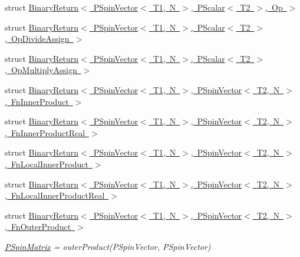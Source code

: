 \begin{DoxyCompactItemize}
\item 
struct \mbox{\hyperlink{structENSEM_1_1BinaryReturn_3_01PSpinVector_3_01T1_00_01N_01_4_00_01PScalar_3_01T2_01_4_00_01Op_01_4}{Binary\+Return$<$ P\+Spin\+Vector$<$ T1, N $>$, P\+Scalar$<$ T2 $>$, Op $>$}}
\item 
struct \mbox{\hyperlink{structENSEM_1_1BinaryReturn_3_01PSpinVector_3_01T1_00_01N_01_4_00_01PScalar_3_01T2_01_4_00_01OpDivideAssign_01_4}{Binary\+Return$<$ P\+Spin\+Vector$<$ T1, N $>$, P\+Scalar$<$ T2 $>$, Op\+Divide\+Assign $>$}}
\item 
struct \mbox{\hyperlink{structENSEM_1_1BinaryReturn_3_01PSpinVector_3_01T1_00_01N_01_4_00_01PScalar_3_01T2_01_4_00_01OpMultiplyAssign_01_4}{Binary\+Return$<$ P\+Spin\+Vector$<$ T1, N $>$, P\+Scalar$<$ T2 $>$, Op\+Multiply\+Assign $>$}}
\item 
struct \mbox{\hyperlink{structENSEM_1_1BinaryReturn_3_01PSpinVector_3_01T1_00_01N_01_4_00_01PSpinVector_3_01T2_00_01N_01_4_00_01FnInnerProduct_01_4}{Binary\+Return$<$ P\+Spin\+Vector$<$ T1, N $>$, P\+Spin\+Vector$<$ T2, N $>$, Fn\+Inner\+Product $>$}}
\item 
struct \mbox{\hyperlink{structENSEM_1_1BinaryReturn_3_01PSpinVector_3_01T1_00_01N_01_4_00_01PSpinVector_3_01T2_00_01N_01_4_00_01FnInnerProductReal_01_4}{Binary\+Return$<$ P\+Spin\+Vector$<$ T1, N $>$, P\+Spin\+Vector$<$ T2, N $>$, Fn\+Inner\+Product\+Real $>$}}
\item 
struct \mbox{\hyperlink{structENSEM_1_1BinaryReturn_3_01PSpinVector_3_01T1_00_01N_01_4_00_01PSpinVector_3_01T2_00_01N_0165efe80400678b53a582cdf54c5c66b4}{Binary\+Return$<$ P\+Spin\+Vector$<$ T1, N $>$, P\+Spin\+Vector$<$ T2, N $>$, Fn\+Local\+Inner\+Product $>$}}
\item 
struct \mbox{\hyperlink{structENSEM_1_1BinaryReturn_3_01PSpinVector_3_01T1_00_01N_01_4_00_01PSpinVector_3_01T2_00_01N_01af7fecc465148c326d536be8c96c14c3}{Binary\+Return$<$ P\+Spin\+Vector$<$ T1, N $>$, P\+Spin\+Vector$<$ T2, N $>$, Fn\+Local\+Inner\+Product\+Real $>$}}
\item 
struct \mbox{\hyperlink{structENSEM_1_1BinaryReturn_3_01PSpinVector_3_01T1_00_01N_01_4_00_01PSpinVector_3_01T2_00_01N_01_4_00_01FnOuterProduct_01_4}{Binary\+Return$<$ P\+Spin\+Vector$<$ T1, N $>$, P\+Spin\+Vector$<$ T2, N $>$, Fn\+Outer\+Product $>$}}
\begin{DoxyCompactList}\small\item\em \mbox{\hyperlink{classENSEM_1_1PSpinMatrix}{P\+Spin\+Matrix}} = outer\+Product(\+P\+Spin\+Vector, P\+Spin\+Vector) \end{DoxyCompactList}\item 

\end{DoxyCompactItemize}
